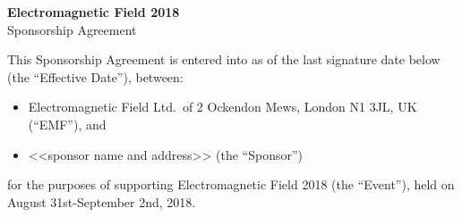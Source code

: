 

\selectfont

\begin{center}
{\bf \LARGE Electromagnetic Field 2018}\\[12pt]
{\Large Sponsorship Agreement}
\end{center}

This Sponsorship Agreement is entered into as of the last signature date below (the ``Effective Date''), between:
\begin{itemize}
    \item Electromagnetic Field Ltd.\ of 2 Ockendon Mews, London N1 3JL, UK (``EMF''), and
    \item <<sponsor name and address>> (the ``Sponsor'')
\end{itemize}

for the purposes of supporting Electromagnetic Field 2018 (the ``Event''), held on August 31st-September 2nd, 2018.

